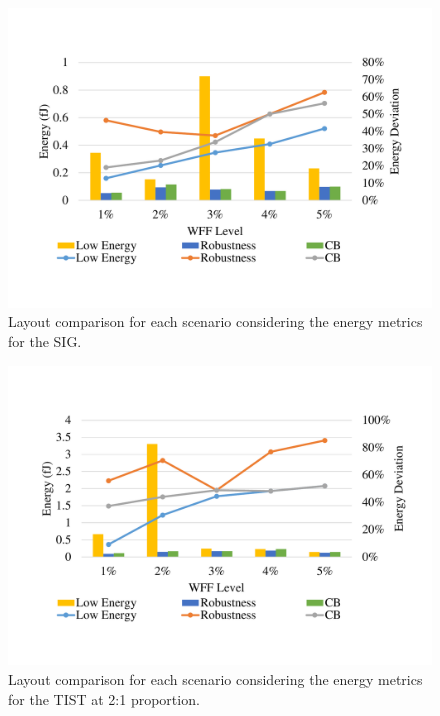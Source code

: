 \documentclass[pgmicro,mestrado,english]{iiufrgs}
\begin{document}
    \begin{figure}[]
        \centering
            \includegraphics[width=1\textwidth, trim={1.25cm 3cm 2cm 3cm}, clip]{comp3Lsig2Energy.pdf}
            \caption{Layout comparison for each scenario considering the energy metrics for the SIG.}
        \label{figscCompSIG}
    \end{figure}
    
    \begin{figure}[]
        \centering
            \includegraphics[width=1\textwidth, trim={1.25cm 3cm 2cm 3cm}, clip]{comp3Ltist212Energy.pdf}
            \caption{Layout comparison for each scenario considering the energy metrics for the TIST at 2:1 proportion.}
        \label{figscCompTIST21}
    \end{figure}
    
\end{document}
